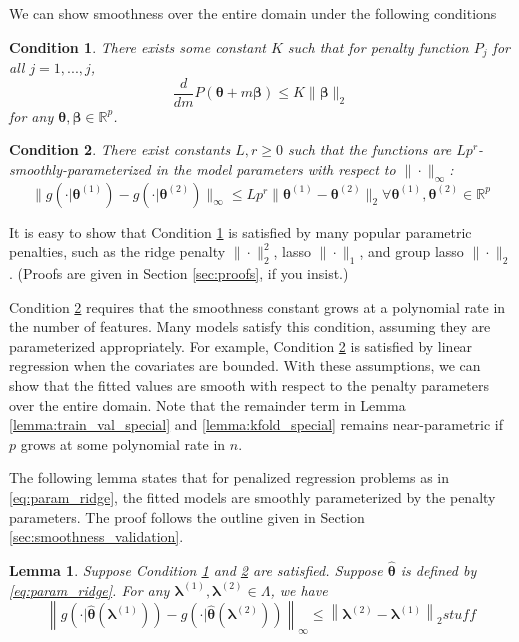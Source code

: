 \documentclass[12pt]{article}
\newtheorem{lemma}{Lemma}
\newtheorem{condition}{Condition}
\begin{document}
We can show smoothness over the entire domain under the following conditions
\begin{condition}
	\label{condn:param1}
	There exists some constant $K$ such that for penalty function $P_j$ for all $j=1,...,j$,
	\begin{equation}
	\frac{d}{d m}P(\boldsymbol{\theta} + m \boldsymbol{\beta}) \le K \|\boldsymbol{\beta}\|_{2}
	\end{equation}
	for any $\boldsymbol{\theta}, \boldsymbol{\beta} \in \mathbb{R}^p$.
\end{condition}

\begin{condition}
	\label{condn:param2}
	There exist constants $L, r \ge 0$ such that the functions are $Lp^r$-smoothly-parameterized in the model parameters with respect to $\| \cdot \|_\infty$:
	\begin{equation}
	\|g(\cdot|\boldsymbol{\theta}^{(1)})-g(\cdot|\boldsymbol{\theta}^{(2)})\|_{\infty}\le Lp^{r}\|\boldsymbol{\theta}^{(1)}-\boldsymbol{\theta}^{(2)}\|_{2} \forall \boldsymbol{\theta}^{(1)}, \boldsymbol{\theta}^{(2)} \in \mathbb{R}^p
	\end{equation}
\end{condition}

It is easy to show that Condition \ref{condn:param1} is satisfied by many popular parametric penalties, such as the ridge penalty $\| \cdot \|_2^2$, lasso $\| \cdot \|_1$, and group lasso $\| \cdot \|_2$. (Proofs are given in Section \ref{sec:proofs}, if you insist.) 

Condition \ref{condn:param2} requires that the smoothness constant grows at a polynomial rate in the number of features. Many models satisfy this condition, assuming they are parameterized appropriately. For example, Condition \ref{condn:param2} is satisfied by linear regression when the covariates are bounded. With these assumptions, we can show that the fitted values are smooth with respect to the penalty parameters over the entire domain. Note that the remainder term in Lemma \ref{lemma:train_val_special} and \ref{lemma:kfold_special} remains near-parametric if $p$ grows at some polynomial rate in $n$.

The following lemma states that for penalized regression problems as in \eqref{eq:param_ridge}, the fitted models are smoothly parameterized by the penalty parameters. The proof follows the outline given in Section \ref{sec:smoothness_validation}. 
\begin{lemma}
	\label{lemma:parametric}
	Suppose Condition \ref{condn:param1} and \ref{condn:param2} are satisfied.
	Suppose $\hat{\boldsymbol{\theta}}$ is defined by \eqref{eq:param_ridge}.
	For any $\boldsymbol{\lambda}^{(1)}, \boldsymbol{\lambda}^{(2)} \in \Lambda$, we have
	\[
	\left \|
	g \left (\cdot|\hat{\boldsymbol{\theta}}(\boldsymbol{\lambda}^{(1)}) \right ) - g \left ( \cdot|\hat{\boldsymbol{\theta}}(\boldsymbol{\lambda}^{(2)}) \right )
	\right \|_{\infty}
	\le
	\left \|
	\boldsymbol{\lambda}^{(2)}-\boldsymbol{\lambda}^{(1)} 
	\right \|_{2}
	stuff
	\]
\end{lemma}
\end{document}
